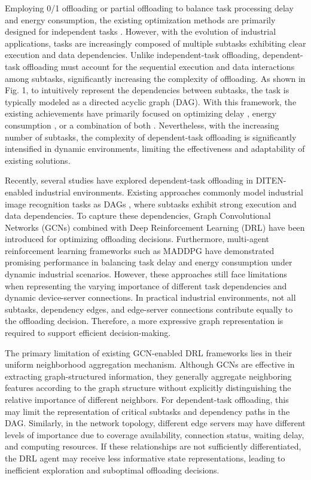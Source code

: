 \documentclass[conference]{IEEEtran}
\begin{document}
Employing 0/1 offloading or partial offloading to balance task processing delay and energy consumption, the existing optimization methods are primarily designed for independent tasks \cite{9663557,9530374,9174795}. However, with the evolution of industrial applications, tasks are increasingly composed of multiple subtasks exhibiting clear execution and data dependencies. Unlike independent-task offloading, dependent-task offloading must account for the sequential execution and data interactions among subtasks, significantly increasing the complexity of offloading. As shown in Fig. 1, to intuitively represent the dependencies between subtasks, the task is typically modeled as a directed acyclic graph (DAG). With this framework, the existing achievements have primarily focused on optimizing delay \cite{nguyen2023dependency}, energy consumption \cite{mehrabi2020energy}, or a combination of both \cite{xu2023energy}. Nevertheless, with the increasing number of subtasks, the complexity of dependent-task offloading is significantly intensified in dynamic environments, limiting the effectiveness and adaptability of existing solutions.

Recently, several studies have explored dependent-task offloading in DITEN-enabled industrial environments. Existing approaches commonly model industrial image recognition tasks as DAGs \cite{10892268}, where subtasks exhibit strong execution and data dependencies. To capture these dependencies, Graph Convolutional Networks (GCNs) combined with Deep Reinforcement Learning (DRL) have been introduced for optimizing offloading decisions. Furthermore, multi-agent reinforcement learning frameworks such as MADDPG have demonstrated promising performance in balancing task delay and energy consumption under dynamic industrial scenarios. However, these approaches still face limitations when representing the varying importance of different task dependencies and dynamic device-server connections. In practical industrial environments, not all subtasks, dependency edges, and edge-server connections contribute equally to the offloading decision. Therefore, a more expressive graph representation is required to support efficient decision-making.

The primary limitation of existing GCN-enabled DRL frameworks lies in their uniform neighborhood aggregation mechanism. Although GCNs are effective in extracting graph-structured information, they generally aggregate neighboring features according to the graph structure without explicitly distinguishing the relative importance of different neighbors. For dependent-task offloading, this may limit the representation of critical subtasks and dependency paths in the DAG. Similarly, in the network topology, different edge servers may have different levels of importance due to coverage availability, connection status, waiting delay, and computing resources. If these relationships are not sufficiently differentiated, the DRL agent may receive less informative state representations, leading to inefficient exploration and suboptimal offloading decisions.
\end{document}
